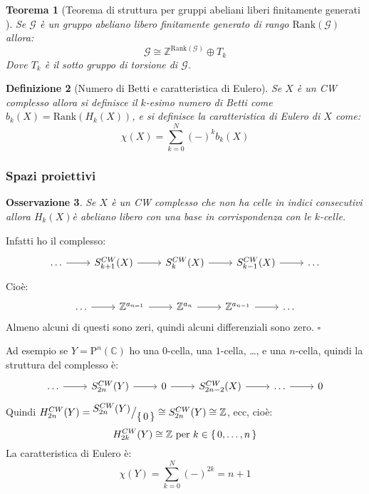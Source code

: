 \documentclass[10pt, twoside=false, x11names]{scrbook}
\newtheorem{theorem}{Teorema}[section]
\newtheorem{osservation}[theorem]{Osservazione}
\newtheorem{definition}[theorem]{Definizione}
\newenvironment{proof}{{\textbf{Dimostrazione}:}}{\hfill $\square$}
\newcommand{\Z}{\mathbb{Z}}
\newcommand{\rank}[1]{\mathrm{Rank}( #1 )}
\newcommand{\Pjc}[1]{\mathrm{P}^#1 (\mathbb{C})}
\newcommand*\quot[2]{{^{\textstyle #1}\big/_{\textstyle #2}}}
\begin{document}
\begin{theorem}[Teorema di struttura per gruppi abeliani liberi finitamente generati
  ]
  Se $ \mathcal{G} $ è un gruppo abeliano libero finitamente generato di rango
  $ \rank{\mathcal{G}} $ allora:
  \[
    \mathcal{G} \cong \Z^{\rank{\mathcal{G}}} \oplus T_k
  \]
  Dove $ T_k $ è il sotto gruppo di torsione di $ \mathcal{G} $.
\end{theorem}

\begin{definition}[Numero di Betti e caratteristica di Eulero]
  Se $ X $ è un CW complesso allora si definisce il $ k $-esimo
  numero di Betti come $ b_k(X) = \rank{H_k(X)} $, e si definisce
  la caratteristica di Eulero di $ X $ come:
  \[
    \chi(X) = \sum_{k=0}^{N} (-)^k b_k(X)
  \]
\end{definition}

\subsubsection{Spazi proiettivi}

\begin{osservation}
  Se $ X $ è un CW complesso che non ha celle in indici consecutivi
  allora $ H_k(X) $è abeliano libero con una base in corrispondenza
  con le $ k $-celle.
\end{osservation}
\begin{proof}
  Infatti ho il complesso:
  \[
    \begin{tikzcd}
      \dots \rar & S^{CW}_{k+1}(X) \rar & S_k^{CW}(X) \rar & S_{k-1}^{CW}(X) \rar & \dots
    \end{tikzcd}
  \]
  Cioè:
  \[
    \begin{tikzcd}
      \dots \rar & \Z^{a_{n=1}} \rar & \Z^{a_n} \rar & \Z^{a_{n-1}} \rar & \dots
    \end{tikzcd}
  \]
  Almeno alcuni di questi sono zeri, quindi alcuni differenziali sono zero.
\end{proof}

Ad esempio se $ Y = \Pjc{n} $ ho una $ 0 $-cella, una $ 1 $-cella, \dots, e una
$ n $-cella, quindi la struttura del complesso è:
\[
  \begin{tikzcd}
    \dots \rar & S^{CW}_{2n}(Y) \rar & 0 \rar & S_{2n - 2}^{CW}(X) \rar & \dots \rar & 0
  \end{tikzcd}
\]
Quindi $ H_{2n}^{CW}(Y) = \quot{S^{CW}_{2n}(Y)}{\set{0}} \cong S_{2n}^{CW}(Y) \cong \Z $,
ecc, cioè:
\[
  H_{2k}^{CW}(Y) \cong \Z \text{ per } k \in \set{0, \dots, n}
\]
La caratteristica di Eulero è:
\[
  \chi(Y) = \sum_{k=0}^N (-)^{2k} = n + 1
\]
\end{document}
